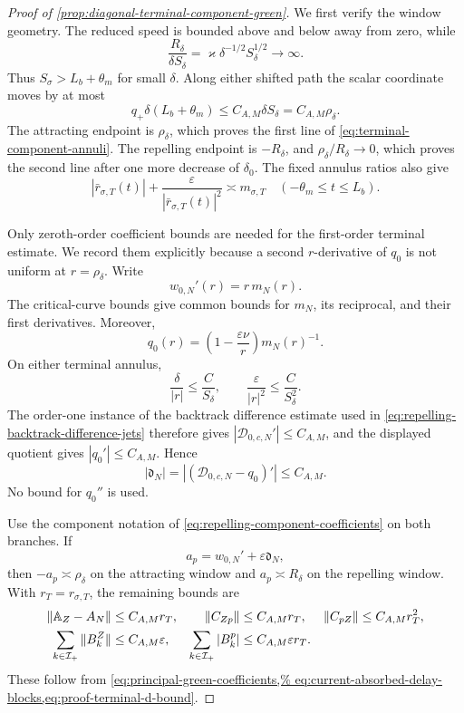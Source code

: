 \begin{proof}[Proof of
\cref{prop:diagonal-terminal-component-green}]
We first verify the window geometry.  The reduced speed is bounded above
and below away from zero, while
\[
 \frac{R_\delta}{\delta S_\delta}
 =\varkappa\delta^{-1/2}S_\delta^{1/2}\longrightarrow\infty .
\]
Thus \(S_\sigma>L_b+\theta_m\) for small \(\delta\).  Along either
shifted path the scalar coordinate moves by at most
\[
 q_+\delta(L_b+\theta_m)\le C_{A,M}\delta S_\delta
 =C_{A,M}\rho_\delta .
\]
The attracting endpoint is \(\rho_\delta\), which proves the first line
of \cref{eq:terminal-component-annuli}.  The repelling endpoint is
\(-R_\delta\), and
\(\rho_\delta/R_\delta\to0\), which proves the second line after one more
decrease of \(\delta_0\).  The fixed annulus ratios also give
\begin{equation}
 |\bar r_{\sigma,T}(t)|
   +\frac{\varepsilon}{|\bar r_{\sigma,T}(t)|^2}
 \asymp m_{\sigma,T}
 \quad(-\theta_m\le t\le L_b).                   \label{eq:proof-terminal-weight-comparison}
\end{equation}

Only zeroth-order coefficient bounds are needed for the first-order
terminal estimate.  We record them explicitly because a second
\(r\)-derivative of \(q_0\) is not uniform at \(r=\rho_\delta\).  Write
\[
 w_{0,N}'(r)=r\,m_N(r).
\]
The critical-curve bounds give common bounds for \(m_N\), its reciprocal,
and their first derivatives.  Moreover,
\[
 q_0(r)=\left(1-\frac{\varepsilon\nu}{r}\right)m_N(r)^{-1}.
\]
On either terminal annulus,
\[
 \frac{\delta}{|r|}\le\frac C{S_\delta},\qquad
 \frac{\varepsilon}{|r|^2}\le\frac C{S_\delta^2}.
                                                        \tag{*}
\]
The order-one instance of the backtrack difference estimate used in
\cref{eq:repelling-backtrack-difference-jets} therefore gives
\(|\mathcal D_{0,c,N}'|\le C_{A,M}\), and the displayed quotient gives
\(|q_0'|\le C_{A,M}\).  Hence
\[
 |\mathfrak d_N|
 =|(\mathcal D_{0,c,N}-q_0)'|\le C_{A,M}.          \label{eq:proof-terminal-d-bound}
\]
No bound for \(q_0''\) is used.

Use the component notation of
\cref{eq:repelling-component-coefficients} on both branches.  If
\[
 a_p=w_{0,N}'+\varepsilon\mathfrak d_N,
\]
then \(-a_p\asymp\rho_\delta\) on the attracting window and
\(a_p\asymp R_\delta\) on the repelling window.  With
\(r_T=r_{\sigma,T}\), the remaining bounds are
\begin{align}
 \|\mathbb A_Z-A_N\|&\le C_{A,M}r_T,&
 \|C_{Zp}\|&\le C_{A,M}r_T,&
 \|C_{pZ}\|&\le C_{A,M}r_T^2,\notag\\
 \sum_{k\in\mathcal I_+}\|B_k^Z\|
 &\le C_{A,M}\varepsilon,&
 \sum_{k\in\mathcal I_+}|B_k^p|
 &\le C_{A,M}\varepsilon r_T .                  \label{eq:proof-terminal-component-ledger}
\end{align}
These follow from
\cref{eq:principal-green-coefficients,%
eq:current-absorbed-delay-blocks,eq:proof-terminal-d-bound}.


\end{proof}
